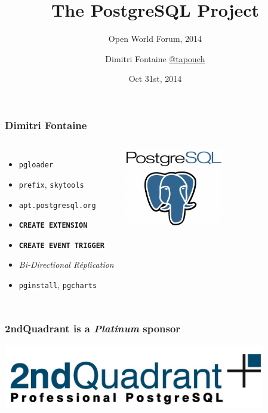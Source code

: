 \documentclass{beamer}
\title{The PostgreSQL Project}
\subtitle{Open World Forum, 2014}
\author{Dimitri Fontaine \linebreak \url{@tapoueh}}
\date{Oct 31st, 2014}
\begin{document}
\frame{\titlepage}

\begin{frame}[fragile]
  \frametitle{Dimitri Fontaine}

  \vfill

\begin{columns}[c]

  \begin{itemize}
   \item \texttt{pgloader}
   \item \texttt{prefix}, \texttt{skytools}
   \item \texttt{apt.postgresql.org}
   \item \texttt{\textbf{CREATE EXTENSION}}
   \item \texttt{\textbf{CREATE EVENT TRIGGER}}
   \item \textit{Bi-Directional Réplication}
   \item \texttt{pginstall}, \texttt{pgcharts}
  \end{itemize}  

\begin{center}
  \includegraphics[height=9em]{postgres-logo.png}
\end{center}
\end{columns}
\end{frame}

\begin{frame}
  \frametitle{2ndQuadrant is a \textit{Platinum} sponsor}

  \begin{center}
    \includegraphics[height=1.1in]{2ndquadrant_logo_full_color.jpg}
  \end{center}
\end{frame}
\end{document}
